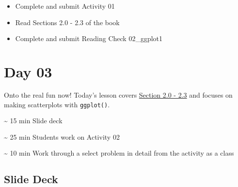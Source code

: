 \documentclass[
  letterpaper,
  DIV=11,
  numbers=noendperiod]{scrreprt}
\begin{document}
\begin{itemize}
\item
  Complete and submit Activity 01
\item
  Read Sections 2.0 - 2.3 of the book
\item
  Complete and submit Reading Check 02\_ggplot1
\end{itemize}


\hypertarget{day-03}{%
\chapter*{Day 03}\label{day-03}}

Onto the real fun now! Today's lesson covers
\href{https://nustat.github.io/intro-stat-data-sci/02-visualization.html}{Section
2.0 - 2.3} and focuses on making scatterplots with \texttt{ggplot()}.

\begin{tcolorbox}[enhanced jigsaw, colframe=quarto-callout-note-color-frame, breakable, colback=white, toprule=.15mm, leftrule=.75mm, title={Agenda}, left=2mm, coltitle=black, bottomtitle=1mm, bottomrule=.15mm, rightrule=.15mm, colbacktitle=quarto-callout-note-color!10!white, opacitybacktitle=0.6, opacityback=0, toptitle=1mm, arc=.35mm, titlerule=0mm]
\textasciitilde{} 15 min Slide deck

\textasciitilde{} 25 min Students work on Activity 02

\textasciitilde{} 10 min Work through a select problem in detail from
the activity as a class
\end{tcolorbox}

\hypertarget{slide-deck-2}{%
\section*{Slide Deck}\label{slide-deck-2}}
\end{document}
